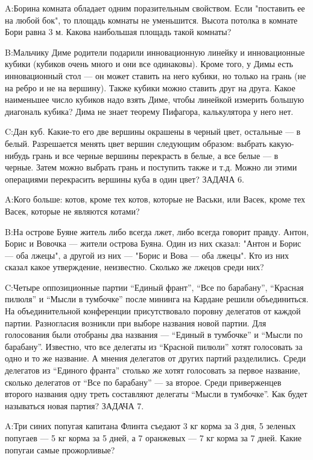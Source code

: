 \documentclass[10pt]{scrbook} \usepackage{modules/nonstahp_book}
\begin{document}
A:\qquad Борина комната обладает одним поразительным свойством. Если "поставить ее на любой  бок", то площадь комнаты не уменьшится. Высота потолка в комнате Бори равна 3 м. Какова наибольшая площадь такой комнаты?

B:\qquad  Мальчику Диме родители подарили инновационную линейку и инновационные кубики (кубиков очень много и они все одинаковы). Кроме того, у Димы есть инновационный стол --- он может ставить на него кубики, но только на грань (не на ребро и не на вершину). Также кубики можно ставить друг на друга. Какое наименьшее число кубиков надо взять Диме, чтобы линейкой измерить большую диагональ кубика? Дима не знает теорему Пифагора, калькулятора у него нет.

C:\qquad Дан куб. Какие-то его две вершины окрашены в черный цвет, остальные — в белый. Разрешается менять цвет вершин следующим образом: выбрать какую-нибудь грань и все черные вершины перекрасть в белые, а все белые — в черные.  Затем можно выбрать грань и поступить также и т.д. Можно ли этими операциями перекрасить вершины куба в один цвет?
\medbreak
\noindent
ЗАДАЧА 6.

A:\qquad  Кого больше: котов, кроме тех котов, которые не Васьки, или Васек, кроме тех Васек, которые не являются котами?

B:\qquad На острове Буяне житель либо всегда лжет, либо всегда говорит правду. Антон, Борис и Вовочка — жители острова Буяна. Один из них сказал: "Антон и Борис — оба лжецы", а другой из них — "Борис и Вова — оба лжецы". Кто из них сказал какое утверждение, неизвестно. Сколько же лжецов среди них?

C:\qquad Четыре оппозиционные партии ``Единый франт'', ``Все по барабану'', ``Красная пилюля'' и ``Мысли в тумбочке'' после мининга на Кардане решили объединиться. На объединительной конференции присутствовало поровну делегатов от каждой партии. Разногласия возникли при выборе названия новой партии. Для голосования были отобраны два названия --- ``Единый в тумбочке'' и ``Мысли по барабану''.  Известно, что все делегаты из ``Красной пилюли'' хотят голосовать за одно и то же название. А мнения делегатов от других партий разделились. Среди делегатов из ``Единого франта'' столько же хотят голосовать за первое название, сколько делегатов от ``Все по барабану'' --- за второе. Среди приверженцев второго названия одну треть составляют делегаты ``Мысли в тумбочке''. Как будет называться новая партия?
\medbreak
\noindent
ЗАДАЧА 7.

A:\qquad Три синих попугая капитана Флинта съедают 3 кг корма за 3 дня, 5 зеленых попугаев --- 5 кг корма за 5 дней, а 7 оранжевых --- 7 кг корма за 7 дней. Какие попугаи самые прожорливые?
\end{document}
